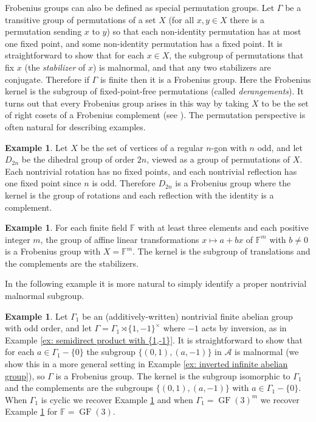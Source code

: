 \documentclass[12pt]{article}
\theoremstyle{definition}
\newtheorem{example}[theorem]{Example}
\newcommand{\bF}{\mathbb F}
\newcommand{\cA}{\mathcal{A}}
\DeclareMathOperator{\GF}{GF}
\begin{document}
Frobenius groups can also be defined as special permutation groups.
Let $\Gamma$ be a transitive group of permutations of a set $X$ (for all $x,y \in X$ there is a permutation sending $x$ to $y$) so that each non-identity permutation has at most one fixed point, and some non-identity permutation has a fixed point.
It is straightforward to show that for each $x \in X$, the subgroup of permutations that fix $x$ (the \emph{stabilizer} of $x$) is malnormal, and that any two stabilizers are conjugate.
Therefore if $\Gamma$ is finite then it is a Frobenius group.
Here the Frobenius kernel is the subgroup of fixed-point-free permutations (called \emph{derangements}).
It turns out that every Frobenius group arises in this way by taking $X$ to be the set of right cosets of a Frobenius complement (see \cite[Theorem 1.7]{Frobenius-groups}).
The permutation perspective is often natural for describing examples.




\begin{example} \label{ex: dihedral group}
Let $X$ be the set of vertices of a regular $n$-gon with $n$ odd, and let $D_{2n}$ be the dihedral group of order $2n$, viewed as a group of permutations of $X$.
Each nontrivial rotation has no fixed points, and each nontrivial reflection has one fixed point since $n$ is odd.
Therefore $D_{2n}$ is a Frobenius group where the kernel is the group of rotations and each reflection with the identity is a complement.
\end{example}


\begin{example} \label{ex: finite field affine transformations}
For each finite field $\bF$ with at least three elements and each positive integer $m$, the group of affine linear transformations $x \mapsto a + bx$ of $\bF^m$ with $b \ne 0$ is a Frobenius group with $X = \bF^m$.
The kernel is the subgroup of translations and the complements are the stabilizers.
\end{example}

In the following example it is more natural to simply identify a proper nontrivial malnormal subgroup.


\begin{example} \label{ex: inverted finite odd abelian group}
Let $\Gamma_1$ be an (additively-written) nontrivial finite abelian group with odd order, and let $\Gamma = \Gamma_1 \rtimes \{1,-1\}^{\times}$ where $-1$ acts by inversion, as in Example \ref{ex: semidirect product with {1,-1}}.
It is straightforward to show that for each $a \in \Gamma_1 - \{0\}$ the subgroup $\{(0,1), (a, -1)\}$ in $\cA$ is malnormal (we show this in a more general setting in Example \ref{ex: inverted infinite abelian group}), so $\Gamma$ is a Frobenius group.
The kernel is the subgroup isomorphic to $\Gamma_1$ and the complements are the subgroups $\{(0,1), (a, -1)\}$ with $a \in \Gamma_1 - \{0\}$.
When $\Gamma_1$ is cyclic we recover Example \ref{ex: dihedral group} and when $\Gamma_1 = \GF(3)^m$ we recover Example \ref{ex: finite field affine transformations} for $\bF = \GF(3)$.
\end{example}
\end{document}
